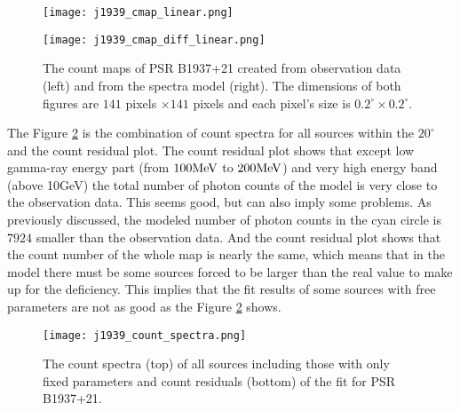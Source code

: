 \documentclass[12pt]{report}
\begin{document}
        \begin{figure}[!htp]
          \begin{center}
          \begin{minipage}{0.45\textwidth}
            \begin{center} 
              \texttt{[image: j1939\_cmap\_linear.png]}
            \end{center}
          \end{minipage}
          \begin{minipage}{0.45\textwidth}
            \begin{center}
              \texttt{[image: j1939\_cmap\_diff\_linear.png]}
            \end{center}
          \end{minipage}
          \end{center}

          \caption{The count maps of PSR B1937+21 created from observation 
            data (left) and from the spectra model (right). The dimensions
            of both figures are $141$ pixels $\times 141$ pixels and each pixel's size is
            $0.2^{\circ}\times0.2^{\circ}$.}
          \label{fig: j1939_count_map_diff}
        \end{figure}

        The Figure \ref{fig: j1939_count_spectra} is the combination of count spectra for 
        all sources within the $20^{\circ}$ and the count residual plot. The count residual 
        plot shows that except low gamma-ray energy part (from $100\hbox{MeV}$ to 
        $200\hbox{MeV}$) and very high energy band (above 10GeV) the total number of photon 
        counts of the model is very close to the observation data. This seems good, but can 
        also imply some problems. As previously discussed, the modeled number of photon counts 
        in the cyan circle is $7924$ smaller than the observation data. And the count residual 
        plot shows that the count number of the whole map is nearly the same, which means that 
        in the model there must be some sources forced to be larger than the real value to make 
        up for the deficiency. This implies that the fit results of some sources with free 
        parameters are not as good as the Figure \ref{fig: j1939_count_spectra} shows. 
        
        \begin{figure}[!htp]
          \centering
          \texttt{[image: j1939\_count\_spectra.png]}
          \caption{The count spectra (top) of all sources including those with only fixed 
            parameters and count residuals (bottom) of the fit for PSR B1937+21.}
          \label{fig: j1939_count_spectra}
        \end{figure}
\end{document}
